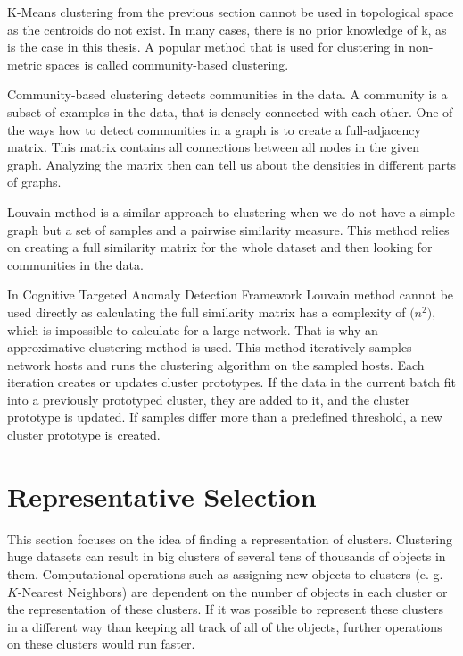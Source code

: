 \documentclass[thesis=B,english]{FITthesis}[2012/10/20]
\begin{document}
K-Means clustering from the previous section cannot be used in topological space as the centroids do not exist.
In many cases, there is no prior knowledge of k, as is the case in this thesis.
A popular method that is used for clustering in non-metric spaces is called community-based clustering.

Community-based clustering detects communities in the data.
A community is a subset of examples in the data, that is densely connected with each other.
One of the ways how to detect communities in a graph is to create a full-adjacency matrix.
This matrix contains all connections between all nodes in the given graph.
Analyzing the matrix then can tell us about the densities in different parts of graphs.

Louvain method is a similar approach to clustering when we do not have a simple graph but a set of samples and a pairwise similarity measure.
This method relies on creating a full similarity matrix for the whole dataset and then looking for communities in the data.

In Cognitive Targeted Anomaly Detection Framework Louvain method cannot be used directly as calculating the full similarity matrix has a complexity of $\mathcal(n^2)$, which is impossible to calculate for a large network.
That is why an approximative clustering method is used.
This method iteratively samples network hosts and runs the clustering algorithm on the sampled hosts.
Each iteration creates or updates cluster prototypes.
If the data in the current batch fit into a previously prototyped cluster, they are added to it, and the cluster prototype is updated.
If samples differ more than a predefined threshold, a new cluster prototype is created.

\section{Representative Selection}
\label{sec:representative_selection}

This section focuses on the idea of finding a representation of clusters.
Clustering huge datasets can result in big clusters of several tens of thousands of objects in them.
Computational operations such as assigning new objects to clusters (e. g. $K$-Nearest Neighbors) are dependent on the number of objects in each cluster or the representation of these clusters.
If it was possible to represent these clusters in a different way than keeping all track of all of the objects, further operations on these clusters would run faster.
\end{document}
